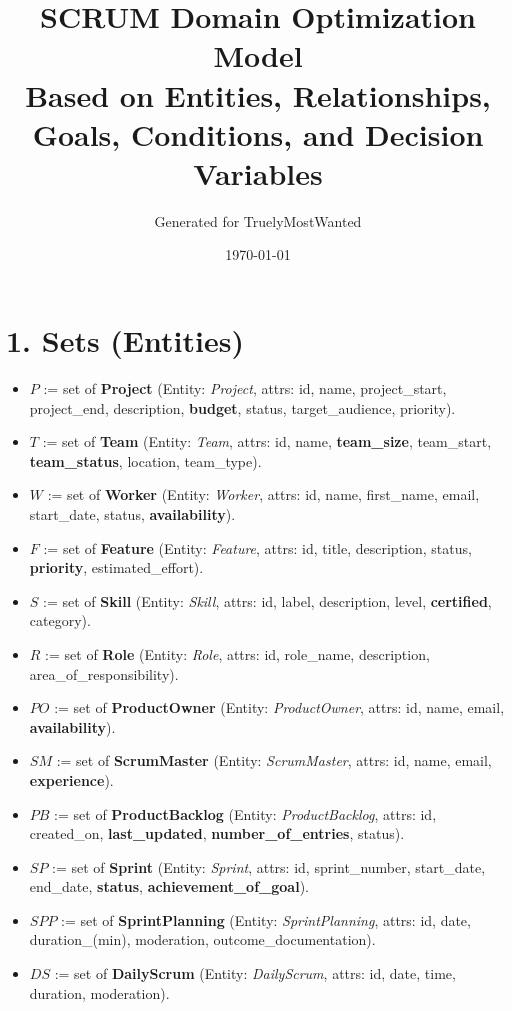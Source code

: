 \documentclass[11pt]{article}
\title{SCRUM Domain Optimization Model\\\large Based on Entities, Relationships, Goals, Conditions, and Decision Variables}
\author{Generated for TruelyMostWanted}
\date{\today}
\begin{document}
\maketitle
\tableofcontents
\newpage

\section{1. Sets (Entities)}
\begin{itemize}[leftmargin=2em]
  \item $P$ := set of \textbf{Project} (Entity: \emph{Project}, attrs: id, name, project\_start, project\_end, description, \textbf{budget}, status, target\_audience, priority).
  \item $T$ := set of \textbf{Team} (Entity: \emph{Team}, attrs: id, name, \textbf{team\_size}, team\_start, \textbf{team\_status}, location, team\_type).
  \item $W$ := set of \textbf{Worker} (Entity: \emph{Worker}, attrs: id, name, first\_name, email, start\_date, status, \textbf{availability}).
  \item $F$ := set of \textbf{Feature} (Entity: \emph{Feature}, attrs: id, title, description, status, \textbf{priority}, estimated\_effort).
  \item $S$ := set of \textbf{Skill} (Entity: \emph{Skill}, attrs: id, label, description, level, \textbf{certified}, category).
  \item $R$ := set of \textbf{Role} (Entity: \emph{Role}, attrs: id, role\_name, description, area\_of\_responsibility).
  \item $PO$ := set of \textbf{ProductOwner} (Entity: \emph{ProductOwner}, attrs: id, name, email, \textbf{availability}).
  \item $SM$ := set of \textbf{ScrumMaster} (Entity: \emph{ScrumMaster}, attrs: id, name, email, \textbf{experience}).
  \item $PB$ := set of \textbf{ProductBacklog} (Entity: \emph{ProductBacklog}, attrs: id, created\_on, \textbf{last\_updated}, \textbf{number\_of\_entries}, status).
  \item $SP$ := set of \textbf{Sprint} (Entity: \emph{Sprint}, attrs: id, sprint\_number, start\_date, end\_date, \textbf{status}, \textbf{achievement\_of\_goal}).
  \item $SPP$ := set of \textbf{SprintPlanning} (Entity: \emph{SprintPlanning}, attrs: id, date, duration\_(min), moderation, outcome\_documentation).
  \item $DS$ := set of \textbf{DailyScrum} (Entity: \emph{DailyScrum}, attrs: id, date, time, duration, moderation).

\end{itemize}
\end{document}
